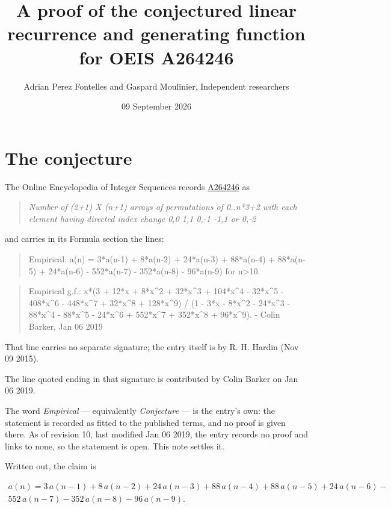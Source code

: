 \documentclass[11pt]{article}
\title{A proof of the conjectured linear recurrence and generating function for OEIS A264246}
\author{Adrian Perez Fontelles and Gaspard Moulinier, Independent researchers}
\date{09 September 2026}
\theoremstyle{definition}
\begin{document}
\maketitle
\section{The conjecture}

The Online Encyclopedia of Integer Sequences records \href{https://oeis.org/A264246}{A264246} as

\begin{quote}\itshape Number of (2+1) X (n+1) arrays of permutations of 0..n*3+2 with each element having directed index change 0,0 1,1 0,-1 -1,1 or 0,-2\end{quote}

and carries in its Formula section the lines:

\begin{quote}\ttfamily Empirical: a(n) = 3*a(n-1) + 8*a(n-2) + 24*a(n-3) + 88*a(n-4) + 88*a(n-5) + 24*a(n-6) - 552*a(n-7) - 352*a(n-8) - 96*a(n-9) for n>10.\end{quote}

\begin{quote}\ttfamily Empirical g.f.: x*(3 + 12*x + 8*x\textasciicircum{}2 + 32*x\textasciicircum{}3 + 104*x\textasciicircum{}4 - 32*x\textasciicircum{}5 - 408*x\textasciicircum{}6 - 448*x\textasciicircum{}7 + 32*x\textasciicircum{}8 + 128*x\textasciicircum{}9) / (1 - 3*x - 8*x\textasciicircum{}2 - 24*x\textasciicircum{}3 - 88*x\textasciicircum{}4 - 88*x\textasciicircum{}5 - 24*x\textasciicircum{}6 + 552*x\textasciicircum{}7 + 352*x\textasciicircum{}8 + 96*x\textasciicircum{}9). - Colin Barker, Jan 06 2019\end{quote}

That line carries no separate signature; the entry itself is by R. H. Hardin (Nov 09 2015).

The line quoted ending in that signature is contributed by Colin Barker on Jan 06 2019.

The word {\itshape Empirical} --- equivalently {\itshape Conjecture} --- is the entry's own: the statement is recorded as fitted to the published terms, and no proof is given there. As of revision 10, last modified Jan 06 2019, the entry records no proof and links to none, so the statement is open. This note settles it.

Written out, the claim is

\begin{multline*} a(n) = 3\,a(n-1) + 8\,a(n-2) + 24\,a(n-3) + 88\,a(n-4) + 88\,a(n-5) + 24\,a(n-6) - \\ 552\,a(n-7) - 352\,a(n-8) - 96\,a(n-9). \end{multline*}
\end{document}
